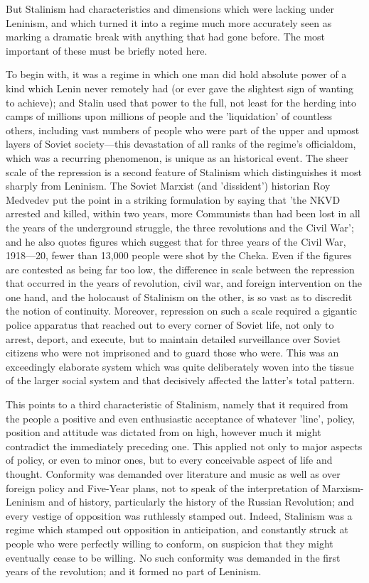 But Stalinism had characteristics and dimensions which were lacking under Leninism, and which turned it into a regime much more accurately seen as marking a dramatic break with anything that had gone before. The most important of these must be briefly noted here.

To begin with, it was a regime in which one man did hold absolute power of a kind which Lenin never remotely had (or ever gave the slightest sign of wanting to achieve); and Stalin used that power to the full, not least for the herding into camps of millions upon millions of people and the 'liquidation' of countless others, including vast numbers of people who were part of the upper and upmost layers of Soviet society—this devastation of all ranks of the regime's officialdom, which was a recurring phenomenon, is unique as an historical event. The sheer scale of the repression is a second feature of Stalinism which distinguishes it most sharply from Leninism. The Soviet Marxist (and 'dissident') historian Roy Medvedev put the point in a striking formulation by saying that 'the NKVD arrested and killed, within two years, more Communists than had been lost in all the years of the underground struggle, the three revolutions and the Civil War'; and he also quotes figures which suggest that for three years of the Civil War, 1918—20, fewer than 13,000 people were shot by the Cheka. Even if the figures are contested as being far too low, the difference in scale between the repression that occurred in the years of revolution, civil war, and foreign intervention on the one hand, and the holocaust of Stalinism on the other, is so vast as to discredit the notion of continuity. Moreover, repression on such a scale required a gigantic police apparatus that reached out to every corner of Soviet life, not only to arrest, deport, and execute, but to maintain detailed surveillance over Soviet citizens who were not imprisoned and to guard those who were. This was an exceedingly elaborate system which was quite deliberately woven into the tissue of the larger social system and that decisively affected the latter's total pattern.

This points to a third characteristic of Stalinism, namely that it required from the people a positive and even enthusiastic acceptance of whatever 'line', policy, position and attitude was dictated from on high, however much it might contradict the immediately preceding one. This applied not only to major aspects of policy, or even to minor ones, but to every conceivable aspect of life and thought. Conformity was demanded over literature and music as well as over foreign policy and Five-Year plans, not to speak of the interpretation of Marxism-Leninism and of history, particularly the history of the Russian Revolution; and every vestige of opposition was ruthlessly stamped out. Indeed, Stalinism was a regime which stamped out opposition in anticipation, and constantly struck at people who were perfectly willing to conform, on suspicion that they might eventually cease to be willing. No such conformity was demanded in the first years of the revolution; and it formed no part of Leninism.

